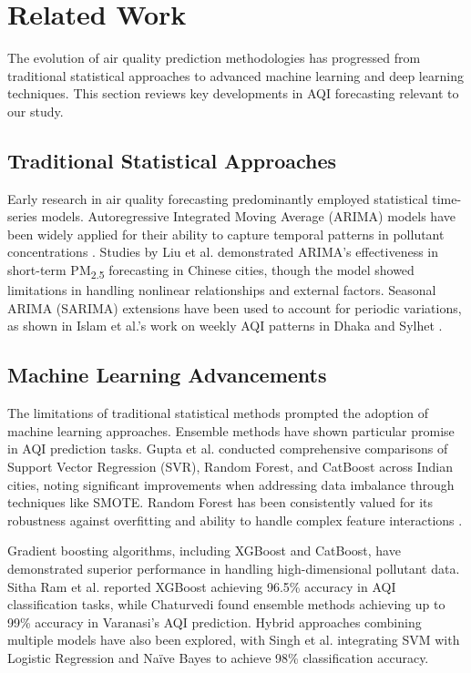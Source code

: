 \documentclass[a4paper,fleqn]{cas-dc}
\begin{document}
\section{Related Work}
\label{sec:related_work}

The evolution of air quality prediction methodologies has progressed from traditional statistical approaches to advanced machine learning and deep learning techniques. This section reviews key developments in AQI forecasting relevant to our study.

\subsection{Traditional Statistical Approaches}

Early research in air quality forecasting predominantly employed statistical time-series models. Autoregressive Integrated Moving Average (ARIMA) models have been widely applied for their ability to capture temporal patterns in pollutant concentrations \cite{box_jenkins_1976}. Studies by Liu et al. \cite{liu_2018} demonstrated ARIMA's effectiveness in short-term PM\textsubscript{2.5} forecasting in Chinese cities, though the model showed limitations in handling nonlinear relationships and external factors. Seasonal ARIMA (SARIMA) extensions have been used to account for periodic variations, as shown in Islam et al.'s work on weekly AQI patterns in Dhaka and Sylhet \cite{islam_2021_sarima}.

\subsection{Machine Learning Advancements}

The limitations of traditional statistical methods prompted the adoption of machine learning approaches. Ensemble methods have shown particular promise in AQI prediction tasks. Gupta et al. \cite{gupta_2021} conducted comprehensive comparisons of Support Vector Regression (SVR), Random Forest, and CatBoost across Indian cities, noting significant improvements when addressing data imbalance through techniques like SMOTE. Random Forest has been consistently valued for its robustness against overfitting and ability to handle complex feature interactions \cite{breiman_2001}.

Gradient boosting algorithms, including XGBoost and CatBoost, have demonstrated superior performance in handling high-dimensional pollutant data. Sitha Ram et al. \cite{sitha_ram_2021} reported XGBoost achieving 96.5\% accuracy in AQI classification tasks, while Chaturvedi \cite{chaturvedi_2022} found ensemble methods achieving up to 99\% accuracy in Varanasi's AQI prediction. Hybrid approaches combining multiple models have also been explored, with Singh et al. \cite{singh_2021} integrating SVM with Logistic Regression and Naïve Bayes to achieve 98\% classification accuracy.
\end{document}
